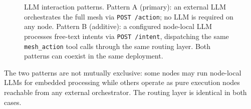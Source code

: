 \documentclass[10pt,twocolumn]{article}
\begin{document}
\begin{figure}[h]
\caption{LLM interaction patterns. Pattern A (primary): an external LLM
orchestrates the full mesh via \texttt{POST /action}; no LLM is
required on any node. Pattern B (additive): a configured node-local LLM
processes free-text intents via \texttt{POST /intent}, dispatching the
same \texttt{mesh\_action} tool calls through the same routing layer.
Both patterns can coexist in the same deployment.}
\label{fig:dual}
\end{figure}

The two patterns are not mutually exclusive: some nodes may run
node-local LLMs for embedded processing while others operate as pure
execution nodes reachable from any external orchestrator.
The routing layer is identical in both cases.
\end{document}
